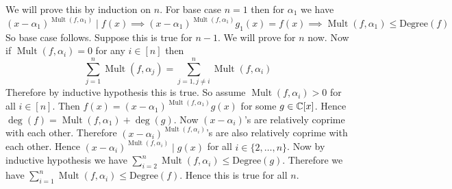 \documentclass[a4paper, 11pt]{article}
\DeclareMathOperator{\mult}{Mult}
\begin{document}
{\begin{enumerate}[label=(\alph*)]
We will prove this by induction on $n$. For base case $n=1$ then for $\alpha_1$ we have $$(x-\alpha_1)^{\mult(f,\alpha_1)}\mid f(x)\implies (x-\alpha_1)^{\mult(f,\alpha_1)}g_1(x)=f(x)\implies \mult(f,\alpha_1)\leq \text{Degree}(f)$$So base case follows. Suppose this is true for $n-1$. We will prove for $n$ now. Now if $\mult(f,\alpha_i)=0$ for any $i\in[n]$ then $$\sum_{j=1}^n\mult(f,\alpha_j)=\sum_{j=1,j\neq i}^n\mult(f,\alpha_i)$$Therefore by inductive hypothesis this is true. So assume $\mult(f,\alpha_i)>0$ for all $i\in[n]$. Then $f(x)=(x-\alpha_1)^{\mult(f,\alpha_1)}g(x)$ for some $g\in\mathbb{C}[x]$. Hence $\deg (f)=\mult(f,\alpha_1)+\deg (g)$. Now $(x-\alpha_i)$'s are relatively coprime with each other. Therefore $(x-\alpha_i)^{\mult(f,\alpha_i)}$'s are also relatively coprime with each other. Hence $(x-\alpha_i)^{\mult(f,\alpha_i)}\mid g(x)$ for all $i\in\{2,\dots, n\}$. Now by inductive hypothesis we have $\sum\limits_{i=2}^n\mult(f,\alpha_i)\leq \text{Degree}(g)$. Therefore we have $\sum\limits_{i=1}^n\mult(f,\alpha_i)\leq \text{Degree}(f)$. Hence this is true for all $n$.
\end{enumerate}
}
\end{document}
